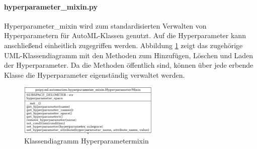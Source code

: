 	\paragraph{hyperparameter\_mixin.py}  Hyperparameter\_mixin wird zum standardisierten Verwalten von Hyperparametern für AutoML-Klassen genutzt. Auf die Hyperparameter kann anschließend einheitlich zugegriffen werden. Abbildung \ref{img:KlassendiagrammHyperparametermixin} zeigt das zugehörige UML-Klassendiagramm mit den Methoden zum Hinzufügen, Löschen und Laden der Hyperparameter. Da die Methoden öffentlich sind, können über jede erbende Klasse die Hyperparameter eigenständig verwaltet werden.	
	\begin{figure}[h]
		\centering
		\includegraphics[width=0.6\textwidth, center]{bilder/Klassendiagramme/Hyperparametermixin.png}
		\caption[Klassendiagramm Hyperparametermixin]{Klassendiagramm Hyperparametermixin}
		\label{img:KlassendiagrammHyperparametermixin}
	\end{figure}  
	
